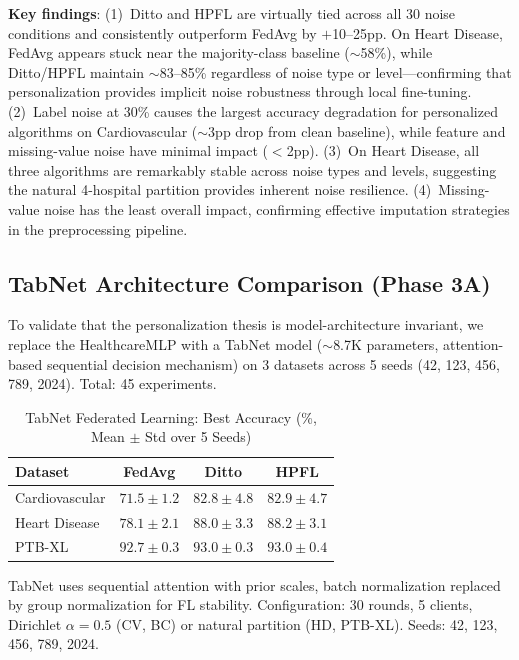 \documentclass[conference]{IEEEtran}
\begin{document}
\textbf{Key findings}: (1)~Ditto and HPFL are virtually tied across all 30 noise conditions and consistently outperform FedAvg by $+$10--25pp. On Heart Disease, FedAvg appears stuck near the majority-class baseline ($\sim$58\%), while Ditto/HPFL maintain $\sim$83--85\% regardless of noise type or level---confirming that personalization provides implicit noise robustness through local fine-tuning. (2)~Label noise at 30\% causes the largest accuracy degradation for personalized algorithms on Cardiovascular ($\sim$3pp drop from clean baseline), while feature and missing-value noise have minimal impact ($<$2pp). (3)~On Heart Disease, all three algorithms are remarkably stable across noise types and levels, suggesting the natural 4-hospital partition provides inherent noise resilience. (4)~Missing-value noise has the least overall impact, confirming effective imputation strategies in the preprocessing pipeline.

\subsection{TabNet Architecture Comparison (Phase 3A)}
\label{sec:tabnet_comparison}

To validate that the personalization thesis is model-architecture invariant, we replace the HealthcareMLP with a TabNet model ($\sim$8.7K parameters, attention-based sequential decision mechanism) on 3 datasets across 5 seeds (42, 123, 456, 789, 2024). Total: 45 experiments.

\begin{table}[htbp]
\centering
\caption{TabNet Federated Learning: Best Accuracy (\%, Mean $\pm$ Std over 5 Seeds)}
\label{tab:tabnet_comparison}
\small
\begin{tabular}{lccc}
\toprule
\textbf{Dataset} & \textbf{FedAvg} & \textbf{Ditto} & \textbf{HPFL} \\
\midrule
Cardiovascular & $71.5 \pm 1.2$ & $82.8 \pm 4.8$ & $\mathbf{82.9 \pm 4.7}$ \\
Heart Disease & $78.1 \pm 2.1$ & $88.0 \pm 3.3$ & $\mathbf{88.2 \pm 3.1}$ \\
PTB-XL & $92.7 \pm 0.3$ & $\mathbf{93.0 \pm 0.3}$ & $93.0 \pm 0.4$ \\
\bottomrule
\end{tabular}

\vspace{1mm}
\par{\footnotesize TabNet uses sequential attention with prior scales, batch normalization replaced by group normalization for FL stability. Configuration: 30 rounds, 5 clients, Dirichlet $\alpha{=}0.5$ (CV, BC) or natural partition (HD, PTB-XL). Seeds: 42, 123, 456, 789, 2024.}
\end{table}
\end{document}
